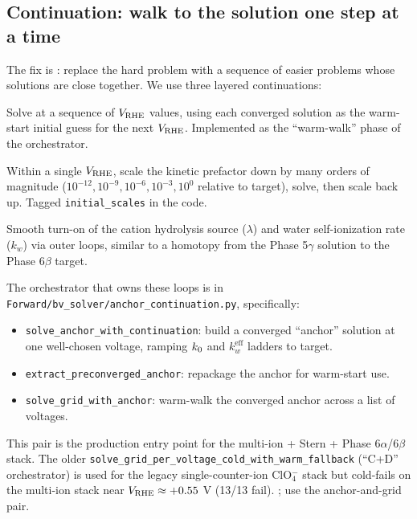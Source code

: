 \documentclass[11pt]{article}
\begin{document}
\subsection{Continuation: walk to the solution one step at a time}

The fix is : replace the hard problem with a
sequence of easier problems whose solutions are close together.
We use three layered continuations:

\begin{description}[leftmargin=*]
  \item[Voltage continuation.] Solve at a sequence of $V_{\mathrm{RHE}}$
      values, using each converged solution as the warm-start
      initial guess for the next $V_{\mathrm{RHE}}$. Implemented as the
      ``warm-walk'' phase of the orchestrator.
  \item[$\kzero$ continuation.] Within a single $V_{\mathrm{RHE}}$, scale the
      kinetic prefactor down by many orders of magnitude
      ($10^{-12}, 10^{-9}, 10^{-6}, 10^{-3}, 10^{0}$ relative to
      target), solve, then scale back up. Tagged
      \texttt{initial\_scales} in the code.
  \item[Phase 6$\beta$-only: $\lambda_{\mathrm{hyd}}$ and
      $k_w^{\mathrm{eff}}$ ladders.] Smooth turn-on of the cation
      hydrolysis source ($\lambda$) and water self-ionization rate
      ($k_w$) via outer loops, similar to a homotopy from the
      Phase 5$\gamma$ solution to the Phase 6$\beta$ target.
\end{description}

The orchestrator that owns these loops is in
\texttt{Forward/bv\_solver/anchor\_continuation.py}, specifically:
\begin{itemize}[leftmargin=*]
\item \texttt{solve\_anchor\_with\_continuation}: build a converged
      ``anchor'' solution at one well-chosen voltage, ramping
      $\kzero$ and $k_w^{\mathrm{eff}}$ ladders to target.
\item \texttt{extract\_preconverged\_anchor}: repackage the anchor
      for warm-start use.
\item \texttt{solve\_grid\_with\_anchor}: warm-walk the converged
      anchor across a list of voltages.
\end{itemize}
This pair is the production entry point for the multi-ion + Stern
+ Phase 6$\alpha$/6$\beta$ stack. The older
\texttt{solve\_grid\_per\_voltage\_cold\_with\_warm\_fallback}
(``C+D'' orchestrator) is used for the legacy single-counter-ion
ClO$_4^-$ stack but cold-fails on the multi-ion stack near
$V_{\mathrm{RHE}} \approx +0.55$ V (13/13 fail). ; use the anchor-and-grid pair.
\end{document}
